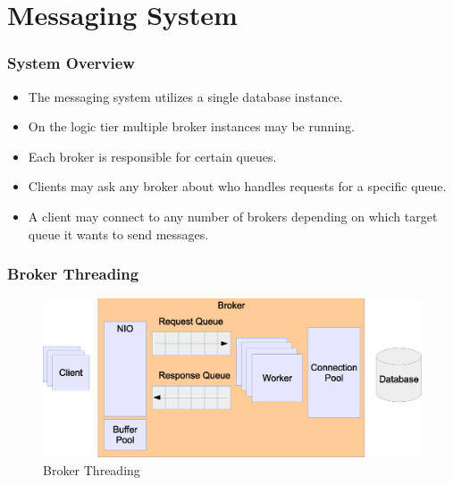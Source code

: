 \documentclass{beamer}
\begin{document}

\section{Messaging System}


\begin{frame}
\frametitle{System Overview}
\begin{itemize}
\item The messaging system utilizes a single database instance. 
\item On the logic tier multiple broker instances may be running. 
\item Each broker is responsible for certain queues.
\item Clients may ask any broker about who handles requests for a specific queue.
\item A client may connect to any number of brokers depending on which target queue it wants to send messages.
\end{itemize}
\end{frame}



\begin{frame}
\frametitle{Broker Threading}
\begin{figure}
  \begin{center}
    \includegraphics[scale=0.42]{../../drawings/broker-threading.eps}
  \end{center}
  \caption{Broker Threading}
  \label{fig:broker-threading}
\end{figure}


\end{frame}

\end{document}
